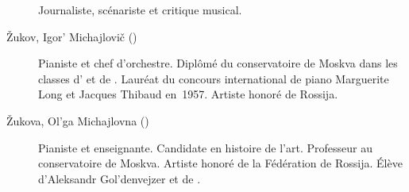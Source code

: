 \begin{description}
 Journaliste, scénariste et critique musical.
 \item[Žukov, Igor' Michajlovič (\Dates{1936}{2018})]%
 Pianiste et chef d'orchestre.
 Diplômé du conservatoire de Moskva dans les classes d'\EGuilels{} et de
 \HNeuhaus{}.
 Lauréat du concours international de piano Marguerite Long et Jacques
 Thibaud en~1957.
 Artiste honoré de Rossija.
 \item[Žukova, Ol'ga Michajlovna (\Dates{1925}{2021})]%
 Pianiste et enseignante.
 Candidate en histoire de l'art.
 Professeur au conservatoire de Moskva.
 Artiste honoré de la Fédération de Rossija.
 Élève d'\hbox{Aleksandr} Gol'denvejzer et de \VSofronitsky{}.
\end{description}
